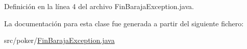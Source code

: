 Definición en la línea 4 del archivo Fin\+Baraja\+Exception.\+java.


\begin{DoxyCode}{0}

\end{DoxyCode}


La documentación para esta clase fue generada a partir del siguiente fichero\+:\begin{DoxyCompactItemize}
\item 
src/poker/\mbox{\hyperlink{FinBarajaException_8java}{Fin\+Baraja\+Exception.\+java}}\end{DoxyCompactItemize}
